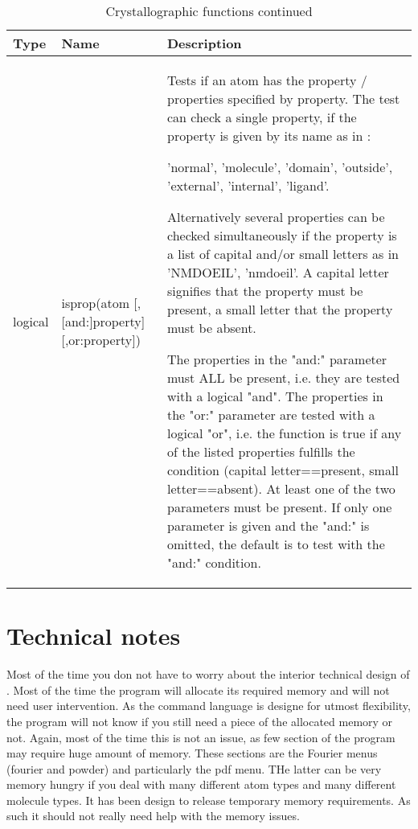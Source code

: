 \begin{table}[!tbh]
\begin{tabularx}{\textwidth}{|p{10mm}|p{47mm}|X|}
  \hline
  {\bf Type} & {\bf Name} & {\bf Description} \\
  \hline\hline
   logical & \raggedright isprop(atom [,[and:]property] [,or:property]) &
       Tests if an atom has the property / properties specified by
       property. The test can check a single property, if the 
       property is given by its name as in :

       'normal', 'molecule', 'domain', 'outside', 'external', 'internal',
       'ligand'. 

       Alternatively several properties can be checked 
       simultaneously if the property is a list of capital and/or 
       small letters as in 'NMDOEIL', 'nmdoeil'. A capital letter 
       signifies that the property must be present, a small letter 
       that the property must be absent. 

       The properties in the "and:" parameter must ALL be present, 
       i.e. they are tested with a logical "and". The properties in
       the "or:" parameter are tested with a logical "or", i.e. the
       function is true if any of the listed properties fulfills
       the condition (capital letter==present, small letter==absent).
       At least one of the two parameters must be present. If only 
       one parameter is given and the "and:" is omitted, the default
       is to test with the "and:" condition. \\
  \hline
\end{tabularx}
\caption{\label{func-cryst2}Crystallographic functions continued}
\end{table}

\section{Technical notes \label{tec}}

Most of the time you don not have to worry about the interior 
technical design of \discus. Most of the time the program will 
allocate its required memory and will not need user intervention.
As the command language is designe for utmost flexibility, the 
program will not know if you still need a piece of the allocated
memory or not. Again, most of the time this is not an issue, as 
few section of the program may require huge amount of memory. 
These sections are the Fourier menus (fourier and powder) and
particularly the pdf menu. THe latter can be very memory hungry 
if you deal with many different atom types and many different 
molecule types. It has been design to 
release temporary memory requirements. As such it should not really
need help with the memory issues. 

